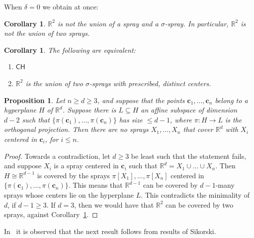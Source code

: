 \documentclass[12pt]{amsart}
\newcommand{\CH}{{\mathsf{CH}}}	%
\newcommand{\R}{\mathbb{R}}	%
\newcommand{\set}[1]{\mathopen \{ {#1} \mathclose \}} %
\theoremstyle{plain}
\newtheorem{proposition}[theorem]{Proposition}
\newtheorem{corollary}[theorem]{Corollary}
\theoremstyle{definition}
\theoremstyle{remark}
\begin{document}
When \( \delta = 0 \) we obtain at once:

\begin{corollary}\label{cor:R2notunionof2sprays}
\( \R^2 \) is not the union of a spray and a \( \sigma \)-spray.
In particular, \( \R^2 \) is not the union of two sprays.
\end{corollary}

\begin{corollary}\label{cor:R2unionof2sigmasprays}
The following are equivalent:
\begin{enumerate}[label={\upshape (\alph*)}]
\item%
\( \CH \)
\item%
\( \R^2 \) is the union of two \( \sigma \)-sprays with prescribed, distinct centers.
\end{enumerate}
\end{corollary}

\begin{proposition}\label{prop:Rdnotunionofdsprays}
Let \( n \geq d \geq 3 \), and suppose that the points \( \mathbf{c}_1 , \dots , \mathbf{c}_n \) belong to a hyperplane \( H \) of \( \R^d \).
Suppose there is \( L \subseteq H \) an affine subspace of dimension \( d - 2 \) such that \( \set{ \pi ( \mathbf{c}_1 ) , \dots , \pi ( \mathbf{c}_n ) } \) has size \( \leq d - 1 \), where \( \pi \colon H \to L \) is the orthogonal projection.
Then there are no sprays \( X_1 , \dots , X_n \) that cover \( \R^d \) with \( X_i \) centered in \( \mathbf{c}_i \), for \( i \leq n \).
\end{proposition}

\begin{proof}
Towards a contradiction, let \( d \geq 3 \) be least such that the statement fails, and suppose \( X_i \) is a spray centered in \( \mathbf{c}_i \) such that \( \R^d = X_1 \cup \dots \cup X_n \).
Then \( H \cong \R^{ d - 1 } \) is covered by the sprays \( \pi [ X_1 ] , \dots , \pi [ X_n ] \) centered in \( \set{ \pi ( \mathbf{c}_1 ) , \dots , \pi ( \mathbf{c}_n ) } \).
This means that \( \R^{ d - 1} \) can be covered by \( d - 1 \)-many sprays whose centers lie on the hyperplane \( L \).
This contradicts the minimality of \( d \), if \( d - 1 \geq 3 \).
If \( d = 3 \), then we would have that \( \R^2 \) can be covered by two sprays, against Corollary~\ref{cor:R2notunionof2sprays}.
\end{proof}

In~\cite[p.~1169]{Schmerl:2012aa} it is observed that the next result follows from results of Sikorski.
\end{document}
